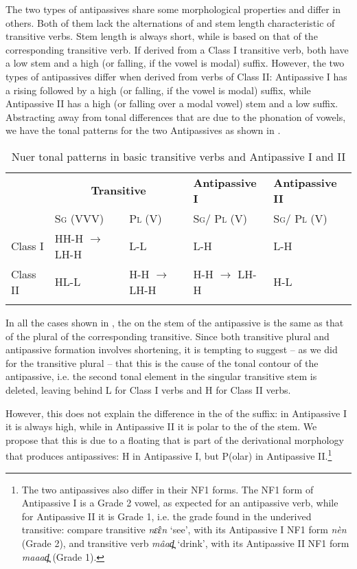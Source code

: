 \documentclass[output=paper,newtxmath,modfonts,nonflat,draftmode]{langsci/langscibook}
\begin{document}
The two types of antipassives share some morphological properties and differ in others. Both of them lack the alternations of  and stem length characteristic of transitive verbs. Stem length is always short, while  is based on that of the corresponding transitive verb. If derived from a Class I transitive verb, both have a low  stem and a high  (or falling, if the vowel is modal) suffix. However, the two types of antipassives differ when derived from verbs of Class II: Antipassive I has a rising  followed by a high (or falling, if the vowel is modal) suffix, while Antipassive II has a high (or falling over a modal vowel) stem and a low suffix. Abstracting away from tonal differences that are due to the phonation of vowels, we have the tonal patterns for the two Antipassives as shown in .



\begin{table}
\begin{tabularx}{\textwidth}{llXXX} 
\lsptoprule
& \multicolumn{2}{c}{\bfseries Transitive} & \bfseries Antipassive I & \bfseries Antipassive II\\
& \textsc{Sg} (VVV) & \textsc{Pl} (V) & \textsc{Sg}/ \textsc{Pl} (V) & \textsc{Sg}/ \textsc{Pl} (V)\\
\midrule
Class I & HH-H $\rightarrow$ LH-H & L-L & L-H & L-H\\
Class II & HL-L & H-H $\rightarrow$ LH-H & H-H $\rightarrow$ LH-H & H-L\\
\lspbottomrule
\end{tabularx}
\caption{Nuer tonal patterns in basic transitive verbs and Antipassive I and II}
\label{tab:monich:13}
\end{table}

In all the cases shown in , the  on the stem of the antipassive is the same as that of the plural of the corresponding  transitive. Since both transitive plural and antipassive formation involves shortening, it is tempting to suggest – as we did for the transitive plural – that this is the cause of the tonal contour of the antipassive, i.e. the second tonal element in the singular transitive stem is deleted, leaving behind L for Class I verbs and H for Class II verbs. 

However, this does not explain the difference in the  of the suffix: in Antipassive I it is always high, while in Antipassive II it is polar to the  of the stem. We propose that this is due to a floating  that is part of the derivational morphology that produces antipassives: H in Antipassive I, but P(olar) in Antipassive II.\footnote{The\label{fn:monich:10} two antipassives also differ in their NF1 forms. The NF1 form of Antipassive I is a Grade 2 vowel, as expected for an antipassive verb, while for Antipassive II it is Grade 1, i.e. the grade found in the underived transitive: compare transitive \textit{nɛ̂ɛn} ‘see’, with its Antipassive I NF1 form \textit{nèn} (Grade 2), and transitive verb \textit{mâad̪} ‘drink’, with its Antipassive II NF1 form \textit{maaad̪} (Grade 1).}  
\end{document}
